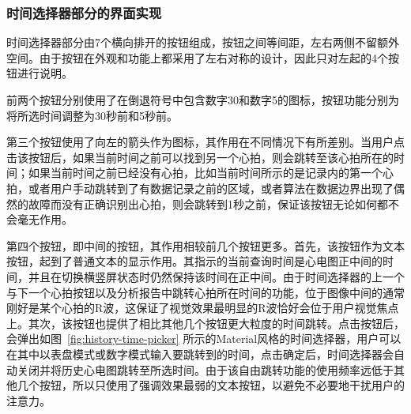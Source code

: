 \subsubsection{时间选择器部分的界面实现}\label{subsubsec:history-time-picker-design}

时间选择器部分由7个横向排开的按钮组成，按钮之间等间距，左右两侧不留额外空间。由于按钮在外观和功能上都采用了左右对称的设计，因此只对左起的4个按钮进行说明。

前两个按钮分别使用了在倒退符号中包含数字30和数字5的图标，按钮功能分别为将所选时间调整为30秒前和5秒前。

第三个按钮使用了向左的箭头作为图标，其作用在不同情况下有所差别。当用户点击该按钮后，如果当前时间之前可以找到另一个心拍，则会跳转至该心拍所在的时间；如果当前时间之前已经没有心拍，比如当前时间所示的是记录内的第一个心拍，或者用户手动跳转到了有数据记录之前的区域，或者算法在数据边界出现了偶然的故障而没有正确识别出心拍，则会跳转到1秒之前，保证该按钮无论如何都不会毫无作用。

第四个按钮，即中间的按钮，其作用相较前几个按钮更多。首先，该按钮作为文本按钮，起到了普通文本的显示作用。其指示的当前查询时间是心电图正中间的时间，并且在切换横竖屏状态时仍然保持该时间在正中间。由于时间选择器的上一个与下一个心拍按钮以及分析报告中跳转心拍所在时间的功能，位于图像中间的通常刚好是某个心拍的R波，这保证了视觉效果最明显的R波恰好会位于用户视觉焦点上。其次，该按钮也提供了相比其他几个按钮更大粒度的时间跳转。点击按钮后，会弹出如图~\ref{fig:history-time-picker} 所示的Material风格的时间选择器，用户可以在其中以表盘模式或数字模式输入要跳转到的时间，点击确定后，时间选择器会自动关闭并将历史心电图跳转至所选时间。由于该自由跳转功能的使用频率远低于其他几个按钮，所以只使用了强调效果最弱的文本按钮，以避免不必要地干扰用户的注意力。

